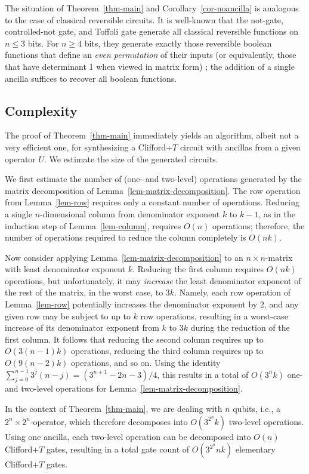 \begin{remark}
  The situation of Theorem~\vref{thm-main} and Corollary~\vref{cor-noancilla} is analogous to the
  case of classical reversible circuits. It is well-known that the not-gate, controlled-not gate,
  and Toffoli gate generate all classical reversible functions on $n\leq 3$ bits. For $n\geq 4$
  bits, they generate exactly those reversible boolean functions that define an {\em even
  permutation} of their inputs (or equivalently, those that have determinant 1 when viewed in
  matrix form) {\cite{Musset97}}; the addition of a single ancilla suffices to recover all boolean
  functions.
\end{remark}


\subsection{Complexity} %
\label{sub:complexity}
The proof of Theorem~\vref{thm-main} immediately yields an algorithm, albeit not a very efficient
one, for synthesizing a Clifford+$T$ circuit with ancillas from a given operator $U$. We estimate
the size of the generated circuits.

We first estimate the number of (one- and two-level) operations generated by the matrix
decomposition of Lemma~\vref{lem-matrix-decomposition}. The row operation from Lemma~\vref{lem-row}
requires only a constant number of operations. Reducing a single $n$-dimensional column from
denominator exponent $k$ to $k-1$, as in the induction step of Lemma~\vref{lem-column}, requires
$O(n)$ operations; therefore, the number of operations required to reduce the column completely is
$O(nk)$.

Now consider applying Lemma~\ref{lem-matrix-decomposition} to an $n\times n$-matrix with least
denominator exponent $k$. Reducing the first column requires $O(nk)$ operations, but unfortunately,
it may {\em increase} the least denominator exponent of the rest of the matrix, in the worst case,
to $3k$. Namely, each row operation of Lemma~\ref{lem-row} potentially increases the denominator
exponent by $2$, and any given row may be subject to up to $k$ row operations, resulting in a
worst-case increase of its denominator exponent from $k$ to $3k$ during the reduction of the first
column. It follows that reducing the second column requires up to $O(3(n-1)k)$ operations, reducing
the third column requires up to $O(9(n-2)k)$ operations, and so on. Using the identity
$\sum_{j=0}^{n-1}3^j(n-j) = (3^{n+1}-2n-3)/4$, this results in a total of $O(3^nk)$ one- and
two-level operations for Lemma~\ref{lem-matrix-decomposition}.

In the context of Theorem~\vref{thm-main}, we are dealing with $n$ qubits, i.e., a $2^n\times
2^n$-operator, which therefore decomposes into $O(3^{2^n}k)$ two-level operations. Using one
ancilla, each two-level operation can be decomposed into $O(n)$ Clifford+$T$ gates, resulting in a
total gate count of $O(3^{2^n}\!nk)$ elementary Clifford+$T$ gates.


